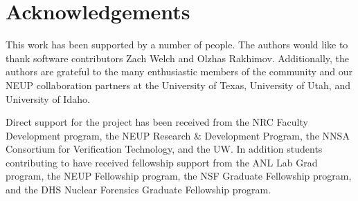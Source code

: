 \section{Acknowledgements}
This work has been supported by a number of people. The authors
would like to thank software contributors Zach Welch and Olzhas Rakhimov.
Additionally, the authors are grateful to the many enthusiastic members of the
\Cyclus community and our \gls{NEUP} collaboration partners at the University
of Texas, University of Utah, and University of Idaho.

Direct support for the \Cyclus project has been received from the \gls{NRC}
Faculty Development program, the \gls{NEUP} Research \& Development Program,
the \gls{NNSA} Consortium for Verification Technology, and the \gls{UW}.  In
addition students contributing to \Cyclus have received fellowship support
from the \gls{ANL} Lab Grad program, the \gls{NEUP} Fellowship program, the
\gls{NSF} Graduate Fellowship program, and the \gls{DHS} Nuclear Forensics
Graduate Fellowship program.
